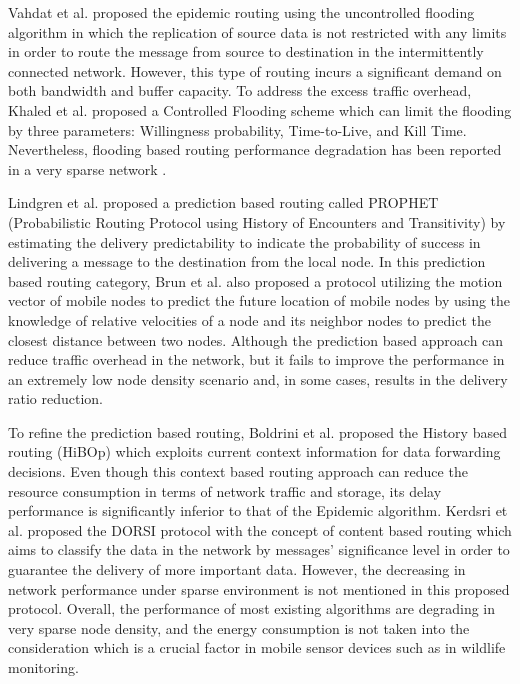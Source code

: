 \documentclass[conference]{IEEEtran}
\begin{document}
Vahdat et al. \cite{Vahdat2000} proposed the epidemic routing using the uncontrolled flooding algorithm in which the replication of source data is not restricted with any limits in order to route the message from source to destination in the intermittently connected network.
However, this type of routing incurs a significant demand on both bandwidth and buffer capacity.
To address the excess traffic overhead, Khaled et al. \cite{Harras2005} proposed a Controlled Flooding  scheme which can limit the flooding by three parameters: Willingness probability, Time-to-Live, and Kill Time.
Nevertheless, flooding based routing performance degradation has been reported in a very sparse network \cite{Neena2013}.

Lindgren et al. \cite{Lindgren2003} proposed a prediction based routing called PROPHET (Probabilistic Routing Protocol using History of Encounters and Transitivity) by estimating the delivery predictability to indicate the probability of success in delivering a message to the destination from the local node.
In this prediction based routing category, Brun et al. \cite{Brendan2005}  also proposed a protocol utilizing the motion vector of mobile nodes to predict the future location of mobile nodes by using the knowledge of relative velocities of a node and its neighbor nodes to predict the closest distance between two nodes.
Although the prediction based approach can reduce traffic overhead in the network, but it fails to improve the performance in an extremely low node density scenario and, in some cases, results in the delivery ratio reduction.

To refine the prediction based routing,  Boldrini et al. \cite{Boldrini2007}  proposed the History based routing (HiBOp) which exploits current context information for data forwarding decisions.
Even though this context based routing approach can reduce the resource consumption in terms of network traffic and storage, its delay performance is significantly inferior to that of the Epidemic algorithm.
Kerdsri et al. \cite{Kerdsri2013} proposed the DORSI protocol with the concept of content based routing which aims to classify the data in the network by messages' significance level in order to guarantee the delivery of more important data. 
However, the decreasing in network performance under sparse environment is not mentioned in this proposed protocol.
Overall, the performance of most existing algorithms are degrading in very sparse node density, and the energy consumption is not taken into the consideration which is a crucial factor in mobile sensor devices such as in wildlife monitoring.
\end{document}

